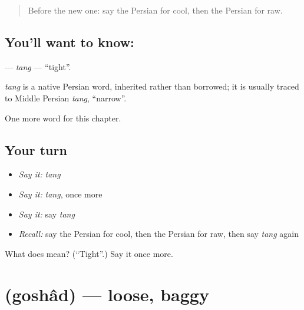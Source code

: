 \label{lesson:FA-C161-tang}



\begin{quote}
Before the new one: say the Persian for cool, then the Persian for raw.
\end{quote}

\subsection*{You'll want to know: }
\textbf{} — \emph{tang} — \textquotedblleft{}tight\textquotedblright{}.

\begin{cousinweb}
\emph{tang} is a native Persian word, inherited rather than borrowed; it is usually traced to Middle Persian \emph{tang}, \textquotedblleft{}narrow\textquotedblright{}.
\end{cousinweb}

\begin{grammarlens}[title={What you've built}]
One more word for this chapter.
\end{grammarlens}

\subsection*{Your turn}
\begin{itemize}
\raggedright
  \item \emph{Say it:} \emph{tang}
  \item \emph{Say it:} \emph{tang}, once more
  \item \emph{Say it:} say \emph{tang}
  \item \emph{Recall:} say the Persian for cool, then the Persian for raw, then say \emph{tang} again
\end{itemize}

\begin{tcolorbox}[breakable,colback=teal!4,colframe=teal!35!black,title={Before you move on}]
What does  mean? (\textquotedblleft{}Tight\textquotedblright{}.) Say it once more.
\end{tcolorbox}
\section[\texorpdfstring{\fa{گشاد} (goshâd)}{گشاد (goshâd)}]{ (goshâd) — loose, baggy}

\label{lesson:FA-C161-goshad}



